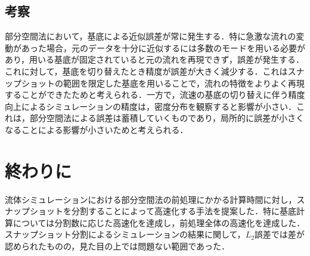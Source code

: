 \documentclass[a4j,12pt]{jreport}
\begin{document}
\section{考察}




部分空間法において，基底による近似誤差が常に発生する．特に急激な流れの変動があった場合，元のデータを十分に近似するには多数のモードを用いる必要があり，用いる基底が固定されていると元の流れを再現できず，誤差が発生する．これに対して，基底を切り替えたとき精度が誤差が大きく減少する．これはスナップショットの範囲を限定した基底を用いることで，流れの特徴をよりよく再現することができたためと考えられる．一方で，流速の基底の切り替えに伴う精度向上によるシミュレーションの精度は，密度分布を観察すると影響が小さい．これは，部分空間法による誤差は蓄積していくものであり，局所的に誤差が小さくなることによる影響が小さいためと考えられる．
\chapter{終わりに}
流体シミュレーションにおける部分空間法の前処理にかかる計算時間に対し，スナップショットを分割することによって高速化する手法を提案した．特に基底計算については分割数に応じた高速化を達成し，前処理全体の高速化を達成した．スナップショット分割によるシミュレーションの結果に関して，$L_2$誤差では差が認められたものの，見た目の上では問題ない範囲であった．
\end{document}

